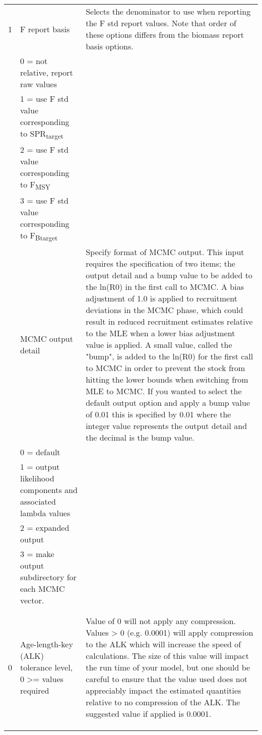{\begin{landscape}
\begin{longtable}{p{1.5cm} p{7cm} p{12.5cm}}
 \hline
 1 & F report basis &  \multirow{1}{1cm}[-0.25cm]{\parbox{12.5cm}{Selects the denominator to use when reporting the F std report values.  Note that order of these options differs from the biomass report basis options.}}\Tstrut\\
   & 0 = not relative, report raw values & \\
   & 1 = use F std value corresponding to SPR\textsubscript{target} & \\
   & 2 = use F std value corresponding to F\textsubscript{MSY} & \\
   & 3 = use F std value corresponding to F\textsubscript{Btarget} & \\

  \pagebreak
  0.01 & MCMC output detail & \multirow{1}{1cm}[-0.25cm]{\parbox{12.5cm}{Specify format of MCMC output. This input requires the specification of two items; the output detail and a bump value to be added to the ln(R0) in the first call to MCMC. A bias adjustment of 1.0 is applied to recruitment deviations in the MCMC phase, which could result in reduced recruitment estimates relative to the MLE when a lower bias adjustment value is applied.  A small value, called the "bump", is added to the ln(R0) for the first call to MCMC in order to prevent the stock from hitting the lower bounds when switching from MLE to MCMC. If you wanted to select the default output option and apply a bump value of 0.01 this is specified by 0.01 where the integer value represents the output detail and the decimal is the bump value.}} \Tstrut\\
  & 0 = default & \\
  & 1 = output likelihood components and associated lambda values &  \\
  & 2 = expanded output &  \\		 
  & 3 = make output subdirectory for each MCMC vector. &  \\
  & & \\
  & & \\		 
  
  \hline
  \hypertarget{ALK}{0} & Age-length-key (ALK) tolerance level, 0 >= values required & \multirow{1}{1cm}[-0.25cm]{\parbox{12.5cm}{Value of 0 will not apply any compression.  Values > 0 (e.g. 0.0001) will apply compression to the ALK which will increase the speed of calculations.  The size of this value will impact the run time of your model, but one should be careful to ensure that the value used does not appreciably impact the estimated quantities relative to no compression of the ALK.  The suggested value if applied is 0.0001.}} \Tstrut\\ 
  & & \\
  & & \\
  & & \Bstrut\\


\end{longtable}
\end{landscape}}
